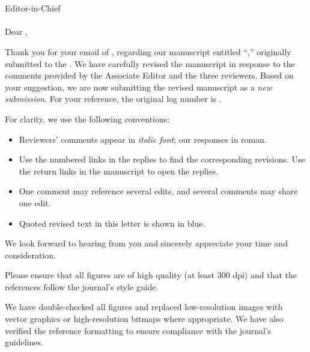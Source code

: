 \documentclass{ar2rc}
\begin{document}
\responseletterheader

\begin{flushleft}
  \printresubmissiondate\\
  \printeditorname\\
  Editor-in-Chief\\
  \printjournalname\\[0.8em]
  Dear \printeditorname,
\end{flushleft}

\noindent
Thank you for your email of \printdecisiondate, regarding our manuscript entitled
``\textit{\printpapertitle},'' originally submitted to the \textit{\printjournalname}.
We have carefully revised the manuscript in response to the comments provided by
the Associate Editor and the three reviewers.
Based on your suggestion, we are now submitting the revised manuscript as a
\textit{new submission}.
For your reference, the original log number is \printmanusid.

\vspace{0.55em}
\noindent
For clarity, we use the following conventions:

\begin{itemize}
  \item Reviewers' comments appear in \textit{italic font}; our responses in roman.
  \item Use the numbered links in the replies to find the corresponding
    revisions. Use the return links in the manuscript to open the replies.
  \item One comment may reference several edits, and several comments may share
    one edit.
  \item Quoted revised text in this letter is shown in {\color{linkblue} blue}.
\end{itemize}

\vspace{0.55em}
\noindent
We look forward to hearing from you and sincerely appreciate your time and
consideration.

\responselettersignature


\begin{generalblock}
\begin{generalcomment}
  \label{com0.0}
  Please ensure that all figures are of high quality (at least 300 dpi) and that
  the references follow the journal's style guide.
\end{generalcomment}
\begin{generalresponse}
  We have double-checked all figures and replaced low-resolution images with
  vector graphics or high-resolution bitmaps where appropriate. We have also
  verified the reference formatting to ensure compliance with the journal's
  guidelines.
\end{generalresponse}
\end{generalblock}
\end{document}
